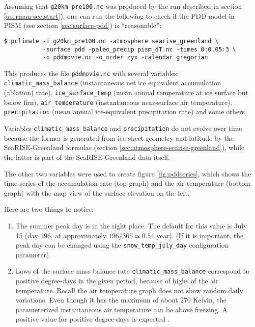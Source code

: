 \documentclass[titlepage,letterpaper,final]{scrartcl}
\begin{document}
Assuming that \texttt{g20km_pre100.nc} was produced by the run described in section
\ref{userman-sec:start}), one can run the following to check if the PDD
model in PISM (see section \ref{sec:surface-pdd}) is ``reasonable'':
\begin{verbatim}
$ pclimate -i g20km_pre100.nc -atmosphere searise_greenland \
           -surface pdd -paleo_precip pism_dT.nc -times 0:0.05:3 \
           -o pddmovie.nc -o_order zyx -calendar gregorian
\end{verbatim}%
This produces the file \texttt{pddmovie.nc} with several variables: \texttt{climatic_mass_balance}
(instantaneous net ice equivalent accumulation (ablation) rate), \texttt{ice_surface_temp}
(mean annual temperature at ice surface but below firn), \texttt{air_temperature}
(instantaneous near-surface air temperature), \texttt{precipitation} (mean annual
ice-equivalent precipitation rate) and some others.

Variables \texttt{climatic_mass_balance} and \texttt{precipitation} do not evolve over time because the 
former is generated from ice sheet geometry and latitude by the
SeaRISE-Greenland formulas (section \ref{sec:atmosphere-searise-greenland}),
while the latter is part of the SeaRISE-Greenland data itself.

The other two variables were used to create figure \ref{fig:pddseries}, which
shows the time-series of the accumulation rate (top graph) and the air
temperature (bottom graph)  with the map view of the surface elevation on the left.

Here are two things to notice:
\begin{enumerate}
\item The summer peak day is in the right place.  The default for this value is
  July 15 (day $196$, at approximately $196/365 \simeq 0.54$ year).  (If it is
  important, the peak day can be changed using the \texttt{snow_temp_july_day}
  configuration parameter).

\item Lows of the surface mass balance rate \texttt{climatic_mass_balance} correspond to
  positive degree-days in the given period, because of highs of the air
  temperature.  Recall the air temperature graph does
  not show random daily variations.  Even though it has the maximum of about $270$
  Kelvin, the parameterized instantaneous air temperature can be above freezing.
  A positive value for positive degree-days is expected \cite{CalovGreve05}.
\end{enumerate}
\end{document}
